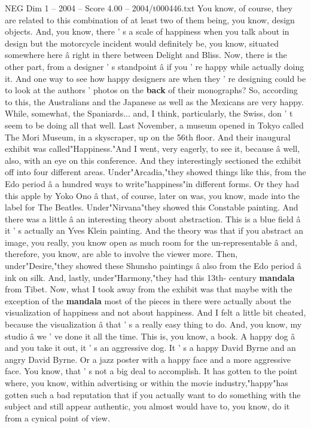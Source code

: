 \begin{textsample}{NEG Dim 1 – 2004 – Score 4.00 – 2004/t000446.txt}
You know, of course, they are related to this combination of at least two of them being, you know, design objects.
And, you know, there ' s a scale of happiness when you talk about in design but the motorcycle incident would definitely be, you know, situated somewhere here â right in there between Delight and Bliss.
Now, there is the other part, from a designer ' s standpoint â if you ' re happy while actually doing it.
And one way to see how happy designers are when they ' re designing could be to look at the authors ' photos on the \textbf{back} of their monographs?
So, according to this, the Australians and the Japanese as well as the Mexicans are very happy.
While, somewhat, the Spaniards... and, I think, particularly, the Swiss, don ' t seem to be doing all that well.
Last November, a museum opened in Tokyo called The Mori Museum, in a skyscraper, up on the 56th floor.
And their inaugural exhibit was called"Happiness."And I went, very eagerly, to see it, because â well, also, with an eye on this conference.
And they interestingly sectioned the exhibit off into four different areas.
Under"Arcadia,"they showed things like this, from the Edo period â a hundred ways to write"happiness"in different forms.
Or they had this apple by Yoko Ono â that, of course, later on was, you know, made into the label for The Beatles.
Under"Nirvana"they showed this Constable painting.
And there was a little â an interesting theory about abstraction.
This is a blue field â it ' s actually an Yves Klein painting.
And the theory was that if you abstract an image, you really, you know open as much room for the un-representable â and, therefore, you know, are able to involve the viewer more.
Then, under"Desire,"they showed these Shunsho paintings â also from the Edo period â ink on silk.
And, lastly, under"Harmony,"they had this 13th- century \textbf{mandala} from Tibet.
Now, what I took away from the exhibit was that maybe with the exception of the \textbf{mandala} most of the pieces in there were actually about the visualization of happiness and not about happiness.
And I felt a little bit cheated, because the visualization â that ' s a really easy thing to do.
And, you know, my studio â we ' ve done it all the time.
This is, you know, a book.
A happy dog â and you take it out, it ' s an aggressive dog.
It ' s a happy David Byrne and an angry David Byrne.
Or a jazz poster with a happy face and a more aggressive face.
You know, that ' s not a big deal to accomplish.
It has gotten to the point where, you know, within advertising or within the movie industry,"happy"has gotten such a bad reputation that if you actually want to do something with the subject and still appear authentic, you almost would have to, you know, do it from a cynical point of view.

\end{textsample}
